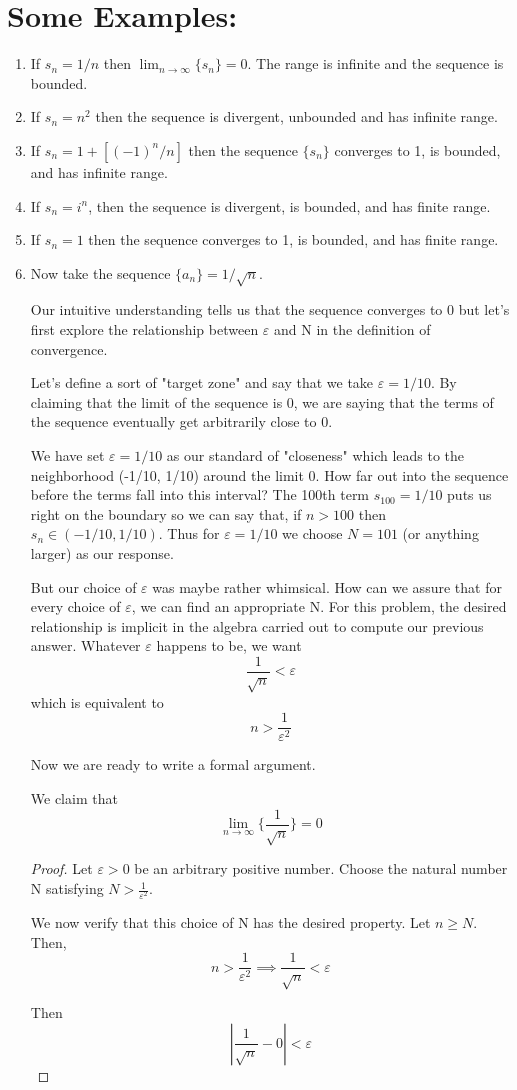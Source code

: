\documentclass{tufte-book}
\theoremstyle{definition}
\numberwithin{section}{chapter}
\begin{document}
\section{Some Examples:}

\begin{enumerate}
	\item If $s_n = 1/n$ then $\lim_{n \to \infty} \{s_n\} = 0$.  The range is infinite and the sequence is bounded.
	\item If $s_n = n^2$ then the sequence is divergent, unbounded and has infinite range.
	\item If $s_n = 1 + [{(-1)^n}/n]$ then the sequence $\{s_n\}$ converges to 1, is bounded, and has infinite range.
	\item If $s_n = i^n$, then the sequence is divergent, is bounded, and has finite range.
	\item If $s_n = 1$ then the sequence converges to 1, is bounded, and has finite range.
	\item  Now take the sequence $\{a_n\}= 1/\sqrt{n}$.
	
	Our intuitive understanding tells us that the sequence converges to 0 but let's first explore the relationship between $\varepsilon$ and N in the definition of convergence.
	
	Let's define a sort of "target zone"  and say that we take $\varepsilon = 1/10$.  By claiming that the limit of the sequence is 0, we are saying that the terms of the sequence eventually get arbitrarily close to 0.  
	
	We have set $\varepsilon = 1/10$ as our standard of "closeness" which leads to the neighborhood (-1/10, 1/10) around the limit 0.  How far out into the sequence before the terms fall into this interval?  The 100th term $s_{100} = 1/10$ puts us right on the boundary so we can say that,  if $n>100$ then $s_n \in (-1/10, 1/10)$.  Thus for $\varepsilon = 1/10$ we choose $N=101$ (or anything larger) as our response.
	
	But our choice of $\varepsilon $ was maybe rather whimsical.  How can we assure that for every choice of $\varepsilon $, we can find an appropriate N.  For this problem, the desired relationship is implicit in the algebra carried out to compute our previous answer.  Whatever $\varepsilon $ happens to be, we want 
	\[\frac{1}{\sqrt{n}} < \varepsilon\]
	which is equivalent to 
	\[n > \frac{1}{\varepsilon ^ 2}\]
	
	Now we are ready to write a formal argument.

We claim that \[\lim_{n \to \infty} \{\frac{1}{\sqrt{n}}\} = 0\]

\begin{proof}
Let $\varepsilon> 0 $ be an arbitrary positive number.  Choose the natural number N satisfying $N > \frac{1}{\varepsilon ^ 2}$.  

We now verify that this choice of N has the desired property.  Let $n \geq N$.  Then,
\[n > \frac{1}{\varepsilon^2} \implies \frac{1}{\sqrt{n}}< \varepsilon\]

Then \[|\frac{1}{\sqrt{n}} - 0| < \varepsilon \]  \end{proof}
\end{enumerate}
\end{document}
